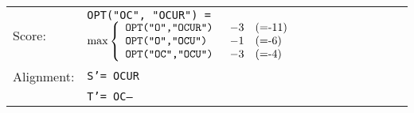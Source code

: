 \documentclass[mathserif]{beamer}
\begin{document}
{\begin{figure}
\begin{tikzpicture}[scale=0.8, auto,swap]
\end{tikzpicture} 
\end{figure}     


 
  \begin{tiny}
 
  \begin{table}
  \begin{tabular}{ll}
  Score:  & \texttt{OPT("OC", "OCUR") = } $  \max \left \{\begin{array}{lll} \text{\tt OPT("O","OCUR") } & -3  & \text{(=-11) } \\ 
  													\text{\tt OPT("O","OCU") }      & -1  & \text{(=-6) } \\
													\text{\tt OPT("OC","OCU") }   &  -3 & \text{(=-4) } \end{array} \right.  $       \\
    Alignment:  &  \texttt{S'=  OCUR } \\ 
   		     &	\texttt{T'=  OC-- } \\
  \end{tabular} 
  \end{table}
  \end{tiny}  

}
\end{document}

